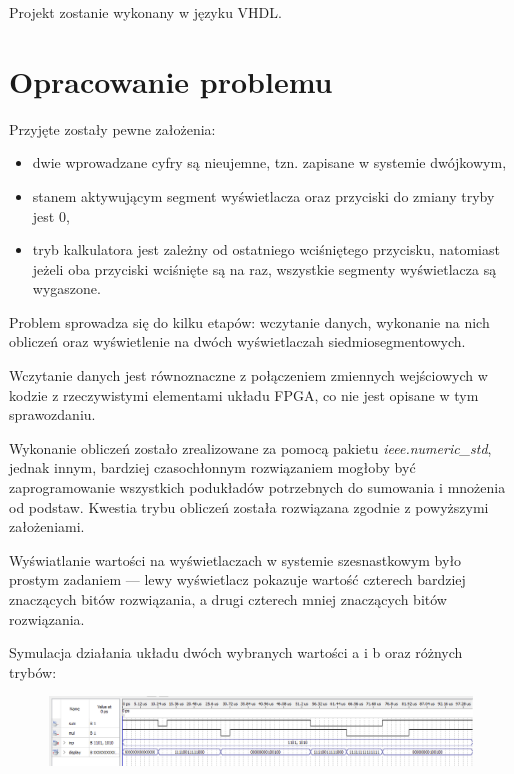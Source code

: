 \documentclass{article}
\begin{document}
Projekt zostanie wykonany w języku VHDL. 

\section{Opracowanie problemu}
Przyjęte zostały pewne założenia: 

\begin{itemize}
    \item
    dwie wprowadzane cyfry są nieujemne, tzn. zapisane w systemie dwójkowym,
    \item
    stanem aktywującym segment wyświetlacza oraz przyciski do zmiany tryby jest 0,
    \item
    tryb kalkulatora jest zależny od ostatniego wciśniętego przycisku, natomiast jeżeli
    oba przyciski wciśnięte są na raz, wszystkie segmenty wyświetlacza są wygaszone.
\end{itemize}

Problem sprowadza się do kilku etapów: wczytanie danych, wykonanie na nich obliczeń oraz wyświetlenie na dwóch 
wyświetlaczah siedmiosegmentowych. 

Wczytanie danych jest równoznaczne z połączeniem zmiennych wejściowych w kodzie z 
rzeczywistymi elementami układu FPGA, co nie jest opisane w tym sprawozdaniu.

Wykonanie obliczeń zostało zrealizowane za pomocą pakietu \textit{ieee.numeric\_std}, jednak innym, bardziej czasochłonnym
rozwiązaniem mogłoby być zaprogramowanie wszystkich podukładów potrzebnych do sumowania i mnożenia od podstaw.
Kwestia trybu obliczeń została rozwiązana zgodnie z powyższymi założeniami.

Wyświatlanie wartości na wyświetlaczach w systemie szesnastkowym było prostym zadaniem --- lewy wyświetlacz pokazuje wartość
czterech bardziej znaczących bitów rozwiązania, a drugi czterech mniej znaczących bitów rozwiązania.

Symulacja działania układu dwóch wybranych wartości a i b oraz różnych trybów:

\begin{figure}[H]
    \begin{adjustwidth}{-1.2in}{-.7in} 
    \centering
    \includegraphics[width=1.4\textwidth]{analiza.png}
    \end{adjustwidth}
\end{figure}
\end{document}
